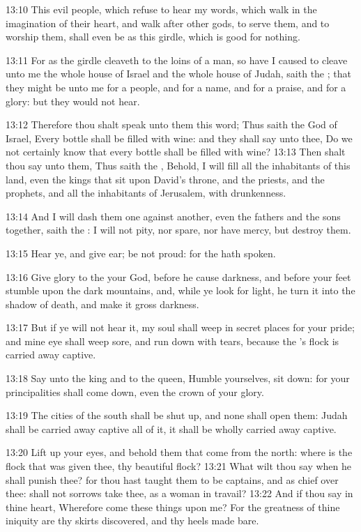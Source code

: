 13:10 This evil people, which refuse to hear my words, which walk in
the imagination of their heart, and walk after other gods, to serve
them, and to worship them, shall even be as this girdle, which is good
for nothing.

13:11 For as the girdle cleaveth to the loins of a man, so have I
caused to cleave unto me the whole house of Israel and the whole house
of Judah, saith the \LORD; that they might be unto me for a people, and
for a name, and for a praise, and for a glory: but they would not
hear.

13:12 Therefore thou shalt speak unto them this word; Thus saith the
\LORD God of Israel, Every bottle shall be filled with wine: and they
shall say unto thee, Do we not certainly know that every bottle shall
be filled with wine?  13:13 Then shalt thou say unto them, Thus saith
the \LORD, Behold, I will fill all the inhabitants of this land, even
the kings that sit upon David's throne, and the priests, and the
prophets, and all the inhabitants of Jerusalem, with drunkenness.

13:14 And I will dash them one against another, even the fathers and
the sons together, saith the \LORD: I will not pity, nor spare, nor
have mercy, but destroy them.

13:15 Hear ye, and give ear; be not proud: for the \LORD hath spoken.

13:16 Give glory to the \LORD your God, before he cause darkness, and
before your feet stumble upon the dark mountains, and, while ye look
for light, he turn it into the shadow of death, and make it gross
darkness.

13:17 But if ye will not hear it, my soul shall weep in secret places
for your pride; and mine eye shall weep sore, and run down with tears,
because the \LORD's flock is carried away captive.

13:18 Say unto the king and to the queen, Humble yourselves, sit down:
for your principalities shall come down, even the crown of your glory.

13:19 The cities of the south shall be shut up, and none shall open
them: Judah shall be carried away captive all of it, it shall be
wholly carried away captive.

13:20 Lift up your eyes, and behold them that come from the north:
where is the flock that was given thee, thy beautiful flock?  13:21
What wilt thou say when he shall punish thee? for thou hast taught
them to be captains, and as chief over thee: shall not sorrows take
thee, as a woman in travail?  13:22 And if thou say in thine heart,
Wherefore come these things upon me?  For the greatness of thine
iniquity are thy skirts discovered, and thy heels made bare.


